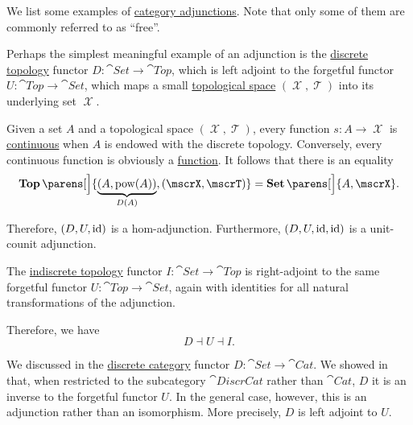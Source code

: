 \begin{example}\label{ex:def:category_adjunction}
  We list some examples of \hyperref[def:category_adjunction]{category adjunctions}. Note that only some of them are commonly referred to as \enquote{free}.

  \begin{thmenum}
     Perhaps the simplest meaningful example of an adjunction is the \hyperref[def:standard_topologies/discrete]{discrete topology} functor \( D: \cat{Set} \to \cat{Top} \), which is left adjoint to the forgetful functor \( U: \cat{Top} \to \cat{Set} \), which maps a small \hyperref[def:topological_space]{topological space} \( (\mscrX, \mscrT) \) into its underlying set \( \mscrX \).

    Given a set \( A \) and a topological space \( (\mscrX, \mscrT) \), every function \( s: A \to \mscrX \) is \hyperref[def:global_continuity]{continuous} when \( A \) is endowed with the discrete topology. Conversely, every continuous function is obviously a \hyperref[def:function]{function}. It follows that there is an equality
    \begin{equation*}
      \cat{Top}\parens[\Big]{ \underbrace{(A, \pow(A))}_{D(A)}, (\mscrX, \mscrT) } = \cat{Set}\parens[\Big]{ A, \mscrX }.
    \end{equation*}

    Therefore, \( (D, U, \operatorname{id}) \) is a hom-adjunction. Furthermore, \( (D, U, \operatorname{id}, \operatorname{id}) \) is a unit-counit adjunction.

     The \hyperref[def:standard_topologies/discrete]{indiscrete topology} functor \( I: \cat{Set} \to \cat{Top} \) is right-adjoint to the same forgetful functor \( U: \cat{Top} \to \cat{Set} \), again with identities for all natural transformations of the adjunction.

    Therefore, we have
    \begin{equation*}
      D \dashv U \dashv I.
    \end{equation*}

     We discussed in  the \hyperref[def:discrete_category]{discrete category} functor \( D: \cat{Set} \to \cat{Cat} \). We showed in  that, when restricted to the subcategory \( \cat{DiscrCat} \) rather than \( \cat{Cat} \), \( D \) it is an inverse to the forgetful functor \( U \). In the general case, however, this is an adjunction rather than an isomorphism. More precisely, \( D \) is left adjoint to \( U \).


\end{thmenum}
\end{example}
